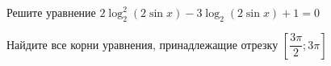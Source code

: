 \begin{ex}
	\begin{condition}
		\begin{enumcols}[label=\asbuk*)]
			\item Решите уравнение \( 2\log_2^2 (2\sin x) - 3\log_2 (2\sin x) + 1 = 0 \)
			\item Найдите все корни уравнения, принадлежащие отрезку \( \left[\dfrac{3\pi}{2};3\pi\right] \)
		\end{enumcols}
	\end{condition}
\end{ex}